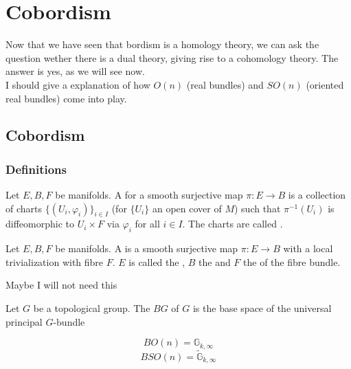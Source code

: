 \documentclass[a4paper,11pt]{article}
\begin{document}
\section{Cobordism}
Now that we have seen that bordism is a homology theory, we can ask the question wether there is a dual theory, giving rise to a cohomology theory. The answer is yes, as we will see now.\\
I should give a explanation of how \(O(n)\) (real bundles) and \(SO(n)\) (oriented real bundles) come into play.

\subsection{Cobordism}

\subsubsection{Definitions}

\begin{definition}
    Let \(E,B,F\) be manifolds. A  for a smooth surjective map \(\pi:E\to B\) is a collection of charts \(\{(U_i,\varphi_i)\}_{i\in I}\) (for \(\{U_i\}\) an open cover of \(M\)) such that \(\pi^{-1}(U_i)\) is diffeomorphic to \(U_i\times F\) via \(\varphi_i\) for all \(i\in I\). The charts are called .
\end{definition}

\begin{definition}
    Let \(E,B,F\) be manifolds. A  is a smooth surjective map \(\pi:E\to B\) with a local trivialization with fibre \(F\).
    \(E\) is called the , \(B\) the  and \(F\) the  of the fibre bundle.
\end{definition}

Maybe I will not need this
\begin{definition}
    Let \(G\) be a topological group. The  \(BG\) of \(G\) is the base space of the universal principal \(G\)-bundle
\end{definition}

\begin{observation}
    \[BO(n)=\mathbb{G}_{k,\infty}\]
    \[BSO(n)=\widetilde{\mathbb{G}}_{k,\infty}\]
\end{observation}
\end{document}
